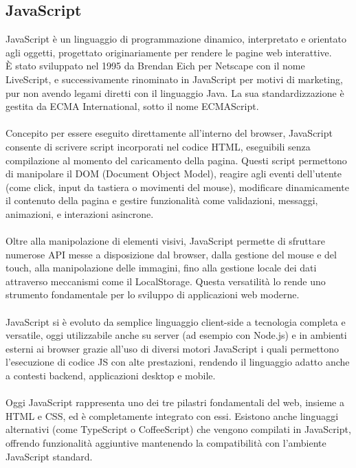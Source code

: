 \subsection{JavaScript}
\noindent JavaScript è un linguaggio di programmazione dinamico, interpretato e orientato agli oggetti, progettato originariamente per rendere le pagine web interattive.\\ 
È stato sviluppato nel 1995 da Brendan Eich per Netscape con il nome LiveScript, e successivamente rinominato in JavaScript per motivi di marketing, pur non avendo legami diretti con il linguaggio Java. La sua standardizzazione è gestita da ECMA International, sotto il nome ECMAScript.\\
\\
Concepito per essere eseguito direttamente all’interno del browser, JavaScript consente di scrivere script incorporati nel codice HTML, eseguibili senza compilazione al momento del caricamento della pagina. Questi script permettono di manipolare il DOM (Document Object Model), reagire agli eventi dell’utente (come click, input da tastiera o movimenti del mouse), modificare dinamicamente il contenuto della pagina e gestire funzionalità come validazioni, messaggi, animazioni, e interazioni asincrone.\\
\\
Oltre alla manipolazione di elementi visivi, JavaScript permette di sfruttare numerose API messe a disposizione dal browser, dalla gestione del mouse e del touch, alla manipolazione delle immagini, fino alla gestione locale dei dati attraverso meccanismi come il LocalStorage. Questa versatilità lo rende uno strumento fondamentale per lo sviluppo di applicazioni web moderne.\\
\\
JavaScript si è evoluto da semplice linguaggio client-side a tecnologia completa e versatile, oggi utilizzabile anche su server (ad esempio con Node.js) e in ambienti esterni ai browser grazie all’uso di diversi motori JavaScript i quali permettono l’esecuzione di codice JS con alte prestazioni, rendendo il linguaggio adatto anche a contesti backend, applicazioni desktop e mobile.\\
\\
Oggi JavaScript rappresenta uno dei tre pilastri fondamentali del web, insieme a HTML e CSS, ed è completamente integrato con essi. Esistono anche linguaggi alternativi (come TypeScript o CoffeeScript) che vengono compilati in JavaScript, offrendo funzionalità aggiuntive mantenendo la compatibilità con l’ambiente JavaScript standard.

